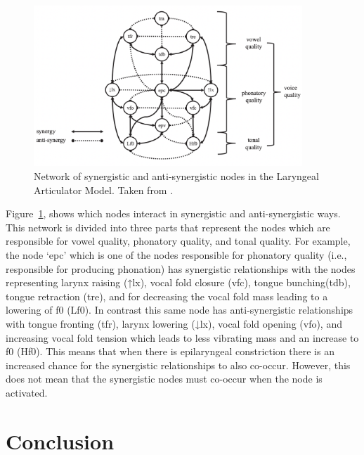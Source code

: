 \documentclass[12pt, letterpaper]{article}
\begin{document}
\begin{figure}[!ht]
	\centering
	\includegraphics[width=0.9\textwidth]{../LAMNetwork.png}
	\caption{Network of synergistic and anti-synergistic nodes in the Laryngeal Articulator Model. Taken from \citet{eslingVoiceQualityLaryngeal2019}.}
	\label{fig:LAMNetwork}
\end{figure}
	
Figure~\ref{fig:LAMNetwork}, shows which nodes interact in synergistic and anti-synergistic ways. This network is divided into three parts that represent the nodes which are responsible for vowel quality, phonatory quality, and tonal quality. For example, the node `epc' which is one of the nodes responsible for phonatory quality (i.e., responsible for producing phonation) has synergistic relationships with the nodes representing larynx raising (↑lx), vocal fold closure (vfc), tongue bunching(tdb), tongue retraction (tre), and for decreasing the vocal fold mass leading to a lowering of f0 (Lf0). In contrast this same node has anti-synergistic relationships with tongue fronting (tfr), larynx lowering (↓lx), vocal fold opening (vfo), and increasing vocal fold tension which leads to less vibrating mass and an increase to f0 (Hf0). This means that when there is epilaryngeal constriction there is an increased chance for the synergistic relationships to also co-occur. However, this does not mean that the synergistic nodes must co-occur when the node is activated. 

\section{Conclusion} \label{sec:Conclusion}


\printbibliography[heading=bibintoc]
\end{document}
